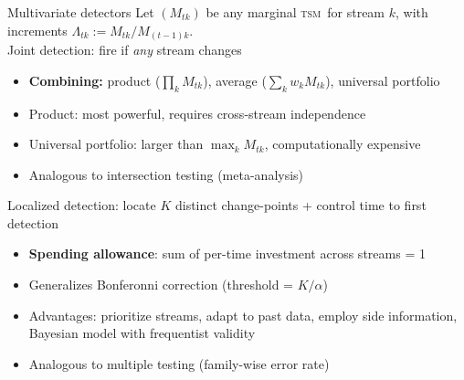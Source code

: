 \documentclass[10pt,aspectratio=169]{beamer}
\newcommand{\TSM}{\textsc{tsm}}
\begin{document}
\begin{frame}{Multivariate detectors}
 Let $(M_{tk})$ be any marginal \TSM\ for stream $k$, with increments $\Lambda_{tk} := M_{tk} / M_{(t-1)k}$. \\
 \vspace{3mm}
    \alert{Joint detection}: fire if \textit{any} stream changes
    \begin{itemize}
        \item \textbf{Combining:} product ($\prod_k M_{tk}$), average ($\sum_k w_k M_{tk}$), universal portfolio
        \item Product: most powerful, requires cross-stream independence \citep{vovkWang2021}
        \item Universal portfolio: larger than $\max_k M_{tk}$, computationally expensive \citep{cover1991} 
        \item Analogous to intersection testing (meta-analysis) 
    \end{itemize}
    \alert{Localized detection}: locate $K$ distinct change-points + control time to first detection
    \begin{itemize}
        \item \textbf{Spending allowance}: sum of per-time investment across streams = 1 
        \item Generalizes Bonferonni correction (threshold = $K/\alpha$)
        \item Advantages: prioritize streams, adapt to past data, employ side information, Bayesian model with frequentist validity
        \item Analogous to multiple testing (family-wise error rate) 
    \end{itemize}
\end{frame}





\end{document}
